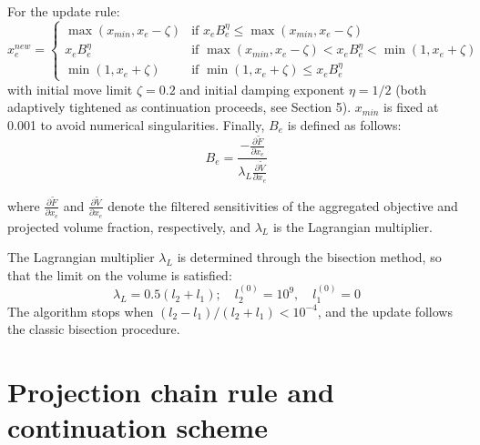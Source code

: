 \documentclass{article}
\begin{document}
For the update rule:
\begin{equation}
x_e^{new} = \begin{cases}
\max(x_{min}, x_e - \zeta) & \text{if } x_e B_e^\eta \leq \max(x_{min}, x_e - \zeta) \\
x_e B_e^\eta & \text{if } \max(x_{min}, x_e - \zeta) < x_e B_e^\eta < \min(1, x_e + \zeta) \\
\min(1, x_e + \zeta) & \text{if } \min(1, x_e + \zeta) \leq x_e B_e^\eta
\end{cases}
\end{equation}
\noindent with initial move limit $\zeta = 0.2$ and initial damping exponent $\eta = 1/2$ (both adaptively tightened as continuation proceeds, see Section 5). $x_{min}$ is fixed at 0.001 to avoid numerical singularities. Finally, $B_e$ is defined as follows:
\begin{equation}
B_e = \frac{-\frac{\partial \tilde{F}}{\partial x_e}}{\lambda_L \frac{\partial \tilde{V}}{\partial x_e}}
\end{equation}

where $\frac{\partial \tilde{F}}{\partial x_e}$ and $\frac{\partial \tilde{V}}{\partial x_e}$ denote the filtered sensitivities of the aggregated objective and projected volume fraction, respectively, and $\lambda_L$ is the Lagrangian multiplier.

The Lagrangian multiplier $\lambda_L$ is determined through the bisection method, so that the limit on the volume is satisfied:
\begin{equation}
\lambda_L = 0.5(l_2 + l_1); \quad l_2^{(0)} = 10^9, \quad l_1^{(0)} = 0
\end{equation}
\noindent The algorithm stops when $(l_2 - l_1)/(l_2 + l_1) < 10^{-4}$, and the update follows the classic bisection procedure.

\section{Projection chain rule and continuation scheme}
\end{document}
